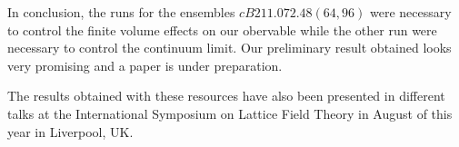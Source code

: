 \documentclass [a4paper, 11pt]{article}
\begin{document}

In conclusion, the runs for the ensembles $cB211.072.48(64,96)$ were necessary to control the 
finite volume effects on our obervable while the other run were necessary to control the continuum 
limit.
Our preliminary result obtained looks very promising and a paper is under preparation. 


The results obtained with these resources have also been presented
in different talks at the International Symposium on Lattice Field
Theory in August of this year in Liverpool, UK.
\end{document}
